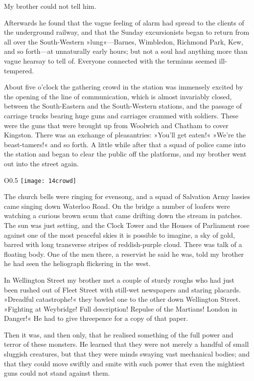 My brother could not tell him.

Afterwards he found that the vague feeling of alarm had spread to the clients of the underground railway, and that the Sunday excursionists began to return from all over the South-Western »lung«—Barnes, Wimbledon, Richmond Park, Kew, and so forth—at unnaturally early hours; but not a soul had anything more than vague hearsay to tell of. Everyone connected with the terminus seemed ill-tempered.

About five o'clock the gathering crowd in the station was immensely excited by the opening of the line of communication, which is almost invariably closed, between the South-Eastern and the South-Western stations, and the passage of carriage trucks bearing huge guns and carriages crammed with soldiers. These were the guns that were brought up from Woolwich and Chatham to cover Kingston. There was an exchange of pleasantries: »You'll get eaten!« »We're the beast-tamers!« and so forth. A little while after that a squad of police came into the station and began to clear the public off the platforms, and my brother went out into the street again.

\begin{wrapfigure}{O}{0.5\textwidth}
\centering
\texttt{[image: 14crowd]}
\end{wrapfigure}

The church bells were ringing for evensong, and a squad of Salvation Army lassies came singing down Waterloo Road. On the bridge a number of loafers were watching a curious brown scum that came drifting down the stream in patches. The sun was just setting, and the Clock Tower and the Houses of Parliament rose against one of the most peaceful skies it is possible to imagine, a sky of gold, barred with long transverse stripes of reddish-purple cloud. There was talk of a floating body. One of the men there, a reservist he said he was, told my brother he had seen the heliograph flickering in the west.

In Wellington Street my brother met a couple of sturdy roughs who had just been rushed out of Fleet Street with still-wet newspapers and staring placards. »Dreadful catastrophe!« they bawled one to the other down Wellington Street. »Fighting at Weybridge! Full description! Repulse of the Martians! London in Danger!« He had to give threepence for a copy of that paper.

Then it was, and then only, that he realised something of the full power and terror of these monsters. He learned that they were not merely a handful of small sluggish creatures, but that they were minds swaying vast mechanical bodies; and that they could move swiftly and smite with such power that even the mightiest guns could not stand against them.

